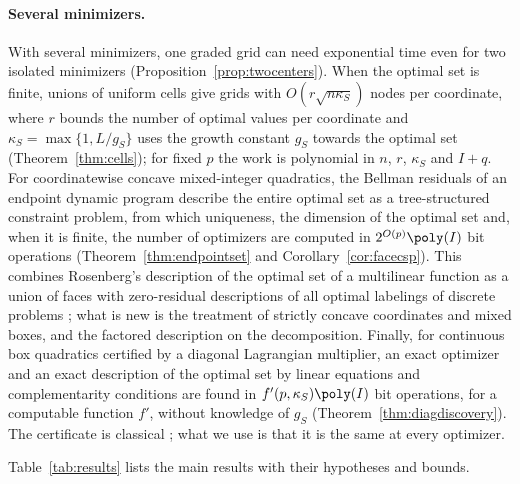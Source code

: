\paragraph{Several minimizers.}
With several minimizers, one graded grid can need exponential time even for
two isolated minimizers (Proposition~\ref{prop:twocenters}). When the optimal
set is finite, unions of uniform cells give grids with $O(r\sqrt{n\kappa_S})$
nodes per coordinate, where $r$ bounds the number of optimal values per
coordinate and $\kappa_S=\max\{1,L/g_S\}$ uses the growth constant $g_S$
towards the optimal set (Theorem~\ref{thm:cells}); for fixed $p$ the work is
polynomial in $n$, $r$, $\kappa_S$ and $I+q$. For coordinatewise concave
mixed-integer quadratics, the Bellman residuals of an endpoint dynamic program
describe the entire optimal set as a tree-structured constraint problem, from
which uniqueness, the dimension of the optimal set and, when it is finite,
the number of optimizers are computed in $2^{O(p)}\poly(I)$ bit operations
(Theorem~\ref{thm:endpointset} and Corollary~\ref{cor:facecsp}). This combines
Rosenberg's description of the optimal set of a multilinear function as a
union of faces \cite{Rosenberg1972} with zero-residual descriptions of all
optimal labelings of discrete problems
\cite{WainwrightJaakkolaWillsky2005,Werner2007}; what is new is the treatment
of strictly concave coordinates and mixed boxes, and the factored description
on the decomposition. Finally, for continuous box quadratics certified by a
diagonal Lagrangian multiplier, an exact optimizer and an exact description
of the optimal set by linear equations and complementarity conditions are
found in $f'(p,\kappa_S)\poly(I)$ bit operations, for a computable function
$f'$, without knowledge of $g_S$ (Theorem~\ref{thm:diagdiscovery}). The certificate is classical
\cite{JeyakumarRubinovWu2006,LiWuQuan2015}; what we use is that it is the
same at every optimizer.

Table~\ref{tab:results} lists the main results with their hypotheses and
bounds.


